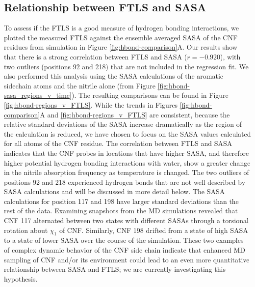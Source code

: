 \subsection{Relationship between FTLS and SASA}

To assess if the FTLS is a good measure of hydrogen bonding interactions, we plotted the measured FTLS against the ensemble averaged SASA of the CNF residues from simulation in Figure \ref{fig:hbond-comparison}A.
Our results show that there is a strong correlation between FTLS and SASA ($r = -0.920$), with two outliers (positions 92 and 218) that are not included in the regression fit.
We also performed this analysis using the SASA calculations of the aromatic sidechain atoms and the nitrile alone (from Figure \ref{fig:hbond-sasa_regions_v_time}).
The resulting comparisons can be found in Figure \ref{fig:hbond-regions_v_FTLS}. 
While the trends in Figures \ref{fig:hbond-comparison}A and \ref{fig:hbond-regions_v_FTLS} are consistent, because the relative standard deviations of the SASA increase dramatically as the region of the calculation is reduced, we have chosen to focus on the SASA values calculated for all atoms of the CNF residue.
The correlation between FTLS and SASA indicates that the CNF probes in locations that have higher SASA, and therefore higher potential hydrogen bonding interactions with water, show a greater change in the nitrile absorption frequency as temperature is changed.
The two outliers of positions 92 and 218 experienced hydrogen bonds that are not well described by SASA calculations and will be discussed in more detail below.
The SASA calculations for position 117 and 198 have larger standard deviations than the rest of the data.
Examining snapshots from the MD simulations revealed that CNF 117 alternated between two states with different SASAs through a torsional rotation about $\chi_1$ of CNF.
Similarly, CNF 198 drifted from a state of high SASA to a state of lower SASA over the course of the simulation.
These two examples of complex dynamic behavior of the CNF side chain indicate that enhanced MD sampling of CNF and/or its environment could lead to an even more quantitative relationship between SASA and FTLS; we are currently investigating this hypothesis. 

